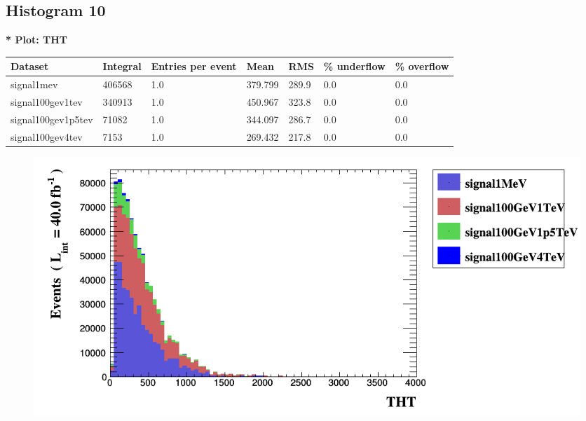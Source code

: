 \documentclass[a4paper, 10pt]{article}
\begin{document}
\subsection{ Histogram 10}

\textbf{* Plot: THT}\\
   \begin{table}[H]
  \begin{center}
    \begin{tabular}{|m{23.0mm}|m{23.0mm}|m{18.0mm}|m{19.0mm}|m{19.0mm}|m{19.0mm}|m{19.0mm}|}
      \hline
      {\cellcolor{yellow}         Dataset}& {\cellcolor{yellow}         Integral}& {\cellcolor{yellow}         Entries per event}& {\cellcolor{yellow}         Mean}& {\cellcolor{yellow}         RMS}& {\cellcolor{yellow}         \% underflow}& {\cellcolor{yellow}         \% overflow}\\
      \hline
      {\cellcolor{white}         signal1mev}& {\cellcolor{white}         406568}& {\cellcolor{white}         1.0}& {\cellcolor{white}         379.799}& {\cellcolor{white}         289.9}& {\cellcolor{green}         0.0}& {\cellcolor{green}         0.0}\\
      \hline
      {\cellcolor{white}         signal100gev1tev}& {\cellcolor{white}         340913}& {\cellcolor{white}         1.0}& {\cellcolor{white}         450.967}& {\cellcolor{white}         323.8}& {\cellcolor{green}         0.0}& {\cellcolor{green}         0.0}\\
      \hline
      {\cellcolor{white}         signal100gev1p5tev}& {\cellcolor{white}         71082}& {\cellcolor{white}         1.0}& {\cellcolor{white}         344.097}& {\cellcolor{white}         286.7}& {\cellcolor{green}         0.0}& {\cellcolor{green}         0.0}\\
      \hline
      {\cellcolor{white}         signal100gev4tev}& {\cellcolor{white}         7153}& {\cellcolor{white}         1.0}& {\cellcolor{white}         269.432}& {\cellcolor{white}         217.8}& {\cellcolor{green}         0.0}& {\cellcolor{green}         0.0}\\
\hline
    \end{tabular}
  \end{center}
\end{table}

\begin{figure}[H]
  \begin{center}
    \includegraphics[scale=0.45]{selection_9.png}\\
\caption{   }
  \end{center}
\end{figure}
      \newpage
\end{document}
